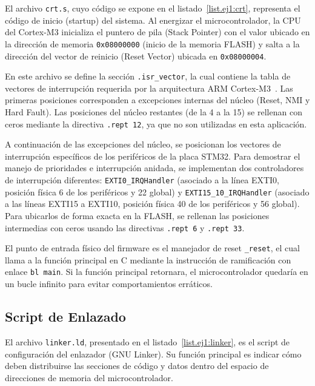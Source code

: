 El archivo \texttt{crt.s}, cuyo código se expone en el listado~\ref{list.ej1:crt}, representa el código de inicio (startup)
del sistema. Al energizar el microcontrolador, la CPU del Cortex-M3 inicializa el puntero de pila (Stack Pointer) con el
valor ubicado en la dirección de memoria \texttt{0x08000000} (inicio de la memoria FLASH) y salta a la dirección del vector
de reinicio (Reset Vector) ubicada en \texttt{0x08000004}.

En este archivo se define la sección \texttt{.isr\_vector}, la cual contiene la tabla de vectores de interrupción requerida por
la arquitectura ARM Cortex-M3~\cite{cortexm3trm}. Las primeras posiciones corresponden a excepciones internas del núcleo (Reset, NMI y Hard Fault).
Las posiciones del núcleo restantes (de la 4 a la 15) se rellenan con ceros mediante la directiva \texttt{.rept 12}, ya que no
son utilizadas en esta aplicación.

A continuación de las excepciones del núcleo, se posicionan los vectores de interrupción específicos de los
periféricos de la placa STM32. Para demostrar el manejo de prioridades e interrupción anidada, se implementan
dos controladores de interrupción diferentes: \texttt{EXTI0\_IRQHandler} (asociado a la línea EXTI0, posición
física 6 de los periféricos y 22 global) y \texttt{EXTI15\_10\_IRQHandler} (asociado a las líneas EXTI15 a EXTI10,
posición física 40 de los periféricos y 56 global). Para ubicarlos de forma exacta en la FLASH, se rellenan
las posiciones intermedias con ceros usando las directivas \texttt{.rept 6} y \texttt{.rept 33}.

El punto de entrada físico del firmware es el manejador de reset \texttt{\_reset}, el cual llama a la función principal en C
mediante la instrucción de ramificación con enlace \texttt{bl main}. Si la función principal retornara, el microcontrolador
quedaría en un bucle infinito para evitar comportamientos erráticos.



\subsection{Script de Enlazado}
\label{sec.ej1:enlazador}

El archivo \texttt{linker.ld}, presentado en el listado~\ref{list.ej1:linker}, es el script de configuración del enlazador
(GNU Linker). Su función principal es indicar cómo deben distribuirse las secciones de código y datos dentro del espacio de
direcciones de memoria del microcontrolador.

